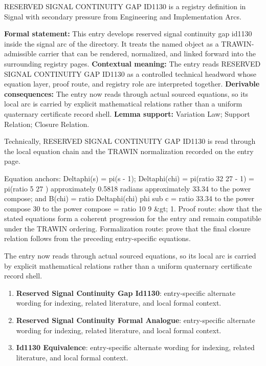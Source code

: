 
\begingroup\small
{}
RESERVED SIGNAL CONTINUITY GAP ID1130 is a registry definition in Signal with secondary pressure from Engineering and Implementation Arcs.

\begingroup\footnotesize\setlength{\emergencystretch}{3em}\sloppy
\textbf{Formal statement:} This entry develops reserved signal continuity gap id1130 inside the signal arc of the directory. It treats the named object as a TRAWIN-admissible carrier that can be rendered, normalized, and linked forward into the surrounding registry pages. \textbf{Contextual meaning:} The entry reads RESERVED SIGNAL CONTINUITY GAP ID1130 as a controlled technical headword whose equation layer, proof route, and registry role are interpreted together. \textbf{Derivable consequences:} The entry now reads through actual sourced equations, so its local arc is carried by explicit mathematical relations rather than a uniform quaternary certificate record shell. \textbf{Lemma support:} Variation Law; Support Relation; Closure Relation.\par
\endgroup

Technically, RESERVED SIGNAL CONTINUITY GAP ID1130 is read through the local equation chain and the TRAWIN normalization recorded on the entry page.

Equation anchors: Deltaphi(s) = pi(s - 1); Deltaphi(chi) = pi(ratio 32 27 - 1) = pi(ratio 5 27 ) approximately 0.5818 radians approximately 33.34 to the power compose; and B(chi) = ratio Deltaphi(chi) phi sub c = ratio 33.34 to the power compose 30 to the power compose = ratio 10 9 \&gt; 1. Proof route: show that the stated equations form a coherent progression for the entry and remain compatible under the TRAWIN ordering. Formalization route: prove that the final closure relation follows from the preceding entry-specific equations.

The entry now reads through actual sourced equations, so its local arc is carried by explicit mathematical relations rather than a uniform quaternary certificate record shell.
\endgroup

\begin{enumerate}[leftmargin=1.6em,itemsep=6pt,topsep=4pt]
\item \textbf{Reserved Signal Continuity Gap Id1130}: entry-specific alternate wording for indexing, related literature, and local formal context.
\item \textbf{Reserved Signal Continuity Formal Analogue}: entry-specific alternate wording for indexing, related literature, and local formal context.
\item \textbf{Id1130 Equivalence}: entry-specific alternate wording for indexing, related literature, and local formal context.
\end{enumerate}

